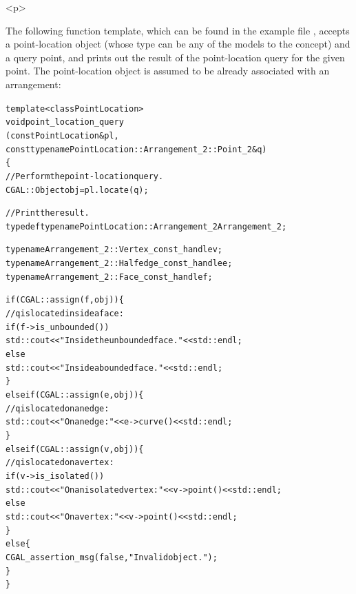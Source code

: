 \begin{ccHtmlOnly}<p>\end{ccHtmlOnly}
The following function template, which can be found in the example
file , accepts a point-location object
(whose type can be any of the models to the
 concept) and a query point, and
prints out the result of the point-location query for the given
point. The point-location object  is assumed to be already
associated with an arrangement:

\begin{alltt}
template <class PointLocation>
void point_location_query
        (const PointLocation& pl,
         const typename PointLocation::Arrangement_2::Point_2& q)
\{
  // Perform the point-location query.
  CGAL::Object obj = pl.locate (q);

  // Print the result.
  typedef typename PointLocation::Arrangement_2  Arrangement_2;

  typename Arrangement_2::Vertex_const_handle    v;
  typename Arrangement_2::Halfedge_const_handle  e;
  typename Arrangement_2::Face_const_handle      f;

  if (CGAL::assign (f, obj)) \{
    // q is located inside a face:
    if (f->is_unbounded())
      std::cout << "Inside the unbounded face." << std::endl;
    else
      std::cout << "Inside a bounded face." << std::endl;
  \}
  else if (CGAL::assign (e, obj)) \{
    // q is located on an edge:
    std::cout << "On an edge: " << e->curve() << std::endl;
  \}
  else if (CGAL::assign (v, obj)) \{
    // q is located on a vertex:
    if (v->is_isolated())
      std::cout << "On an isolated vertex: " << v->point() << std::endl;
    else
      std::cout << "On a vertex: " << v->point() << std::endl;
  \}
  else \{
    CGAL_assertion_msg (false, "Invalid object.");
  \}
\}
\end{alltt}

